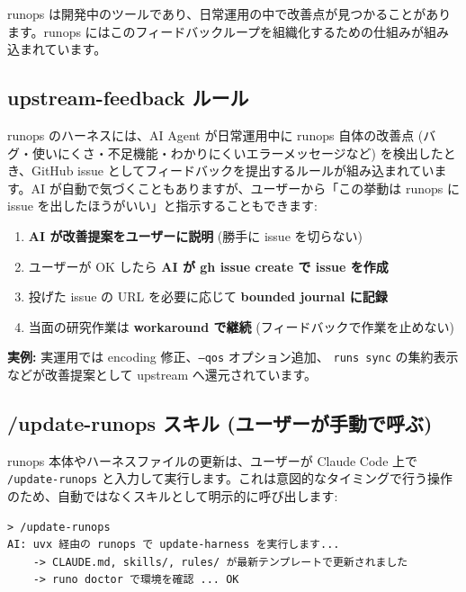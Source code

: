 \documentclass[a4paper,11pt]{article}
\newenvironment{infobox}{%
  \medskip\noindent
  \fboxrule=0.5pt\fboxsep=8pt
  \fcolorbox{infoframe}{infobg}\bgroup\minipage{\dimexpr\linewidth-2\fboxsep-2\fboxrule}
}{%
  \endminipage\egroup\medskip
}
\begin{document}
runops は開発中のツールであり、日常運用の中で改善点が見つかることがあります。runops にはこのフィードバックループを組織化するための仕組みが組み込まれています。

\subsection*{\color{accent} upstream-feedback ルール}

runops のハーネスには、AI Agent が日常運用中に runops 自体の改善点 (バグ・使いにくさ・不足機能・わかりにくいエラーメッセージなど) を検出したとき、GitHub issue としてフィードバックを提出するルールが組み込まれています。AI が自動で気づくこともありますが、ユーザーから「この挙動は runops に issue を出したほうがいい」と指示することもできます:

\begin{enumerate}[nosep]
  \item \textbf{AI が改善提案をユーザーに説明} (勝手に issue を切らない)
  \item ユーザーが OK したら \textbf{AI が gh issue create で issue を作成}
  \item 投げた issue の URL を必要に応じて \textbf{bounded journal に記録}
  \item 当面の研究作業は \textbf{workaround で継続} (フィードバックで作業を止めない)
\end{enumerate}

\begin{infobox}
\textbf{実例:} 実運用では encoding 修正、\texttt{--qos} オプション追加、
\texttt{runs sync} の集約表示などが改善提案として upstream へ還元されています。
\end{infobox}

\subsection*{\color{accent} /update-runops スキル (ユーザーが手動で呼ぶ)}

runops 本体やハーネスファイルの更新は、ユーザーが Claude Code 上で \texttt{/update-runops} と入力して実行します。これは意図的なタイミングで行う操作のため、自動ではなくスキルとして明示的に呼び出します:

\begin{lstlisting}[language={},commentstyle={}]
> /update-runops
AI: uvx 経由の runops で update-harness を実行します...
    -> CLAUDE.md, skills/, rules/ が最新テンプレートで更新されました
    -> runo doctor で環境を確認 ... OK
\end{lstlisting}
\end{document}
